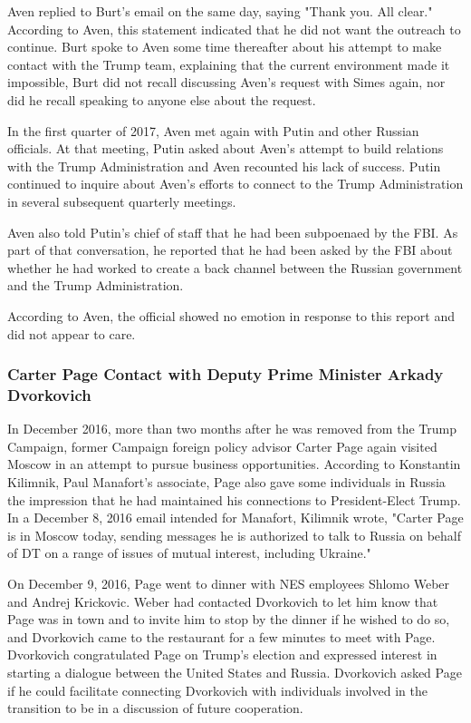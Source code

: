 Aven replied to Burt's email on the same day, saying "Thank you. All clear."%
According to Aven, this statement indicated that he did not want the outreach to continue.%
Burt spoke to Aven some time thereafter about his attempt to make contact with the Trump team, explaining that the current environment made it impossible,
Burt did not recall discussing Aven's request with Simes again, nor did he recall speaking to anyone else about the request.%

In the first quarter of 2017, Aven met again with Putin and other Russian officials.%
At that meeting, Putin asked about Aven's attempt to build relations with the Trump Administration and Aven recounted his lack of success.%
Putin continued to inquire about Aven's efforts to connect to the Trump Administration in several subsequent quarterly meetings.%

Aven also told Putin's chief of staff that he had been subpoenaed by the FBI.%
As part of that conversation, he reported that he had been asked by the FBI about whether he had worked to create a back channel between the Russian government and the Trump Administration.%

According to Aven, the official showed no emotion in response to this report and did not appear to care.%

\subsubsection{Carter Page Contact with Deputy Prime Minister Arkady Dvorkovich}

In December 2016, more than two months after he was removed from the Trump Campaign, former Campaign foreign policy advisor Carter Page again visited Moscow in an attempt to pursue business opportunities.%
According to Konstantin Kilimnik, Paul Manafort's associate, Page also gave some individuals in Russia the impression that he had maintained his connections to President-Elect Trump.
In a December 8, 2016 email intended for Manafort, Kilimnik wrote, "Carter Page is in Moscow today, sending messages he is authorized to talk to Russia on behalf of DT on a range of issues of mutual interest, including Ukraine."%

On December 9, 2016, Page went to dinner with NES employees Shlomo Weber and Andrej Krickovic.%
Weber had contacted Dvorkovich to let him know that Page was in town and to invite him to stop by the dinner if he wished to do so, and Dvorkovich came to the restaurant for a few minutes to meet with Page.%
Dvorkovich congratulated Page on Trump's election and expressed interest in starting a dialogue between the United States and Russia.%
Dvorkovich asked Page if he could facilitate connecting Dvorkovich with individuals involved in the transition to be in a discussion of future cooperation.%

